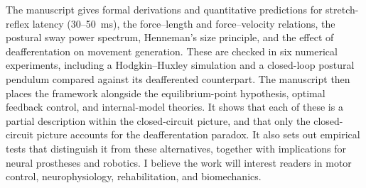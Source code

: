 The manuscript gives formal derivations and quantitative predictions for stretch-reflex latency (30--50~ms), the force--length and force--velocity relations, the postural sway power spectrum, Henneman's size principle, and the effect of deafferentation on movement generation. These are checked in six numerical experiments, including a Hodgkin--Huxley simulation and a closed-loop postural pendulum compared against its deafferented counterpart. The manuscript then places the framework alongside the equilibrium-point hypothesis, optimal feedback control, and internal-model theories. It shows that each of these is a partial description within the closed-circuit picture, and that only the closed-circuit picture accounts for the deafferentation paradox. It also sets out empirical tests that distinguish it from these alternatives, together with implications for neural prostheses and robotics. I believe the work will interest readers in motor control, neurophysiology, rehabilitation, and biomechanics.

\declarations

\signoff

